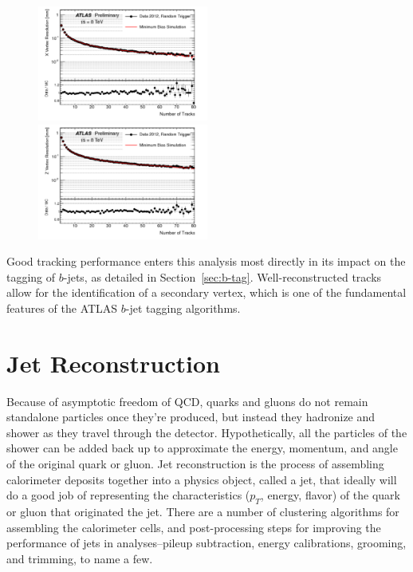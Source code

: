\begin{figure}
	\includegraphics[width=0.5\textwidth]{ReconstructionPerformance/images/track_perf3.pdf}
	\includegraphics[width=0.5\textwidth]{ReconstructionPerformance/images/track_perf4.pdf}
	\label{fig:track_perfB}  
	\caption{}
\end{figure}

Good tracking performance enters this analysis most directly in its impact on the tagging of $b$-jets, as detailed in Section~\ref{sec:b-tag}.  Well-reconstructed tracks allow for the identification of a secondary vertex, which is one of the fundamental features of the ATLAS $b$-jet tagging algorithms.





\section{Jet Reconstruction}
\label{sec:jet_reco}
Because of asymptotic freedom of QCD, quarks and gluons do not remain standalone particles once they're produced, but instead they hadronize and shower as they travel through the detector.  Hypothetically, all the particles of the shower can be added back up to approximate the energy, momentum, and angle of the original quark or gluon.  Jet reconstruction is the process of assembling calorimeter deposits together into a physics object, called a jet, that ideally will do a good job of representing the characteristics ($p_T$, energy, flavor) of the quark or gluon that originated the jet.  There are a number of clustering algorithms for assembling the calorimeter cells, and post-processing steps for improving the performance of jets in analyses--pileup subtraction, energy calibrations, grooming, and trimming, to name a few.  


